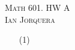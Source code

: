 \documentclass[12pt]{amsart}
\begin{document}
\begin{center}
    \textsc{Math 601. HW A\\ Ian Jorquera}
\end{center}
\vspace{1em}
\begin{itemize}
    \item[(1)]
\end{itemize}
\end{document}
